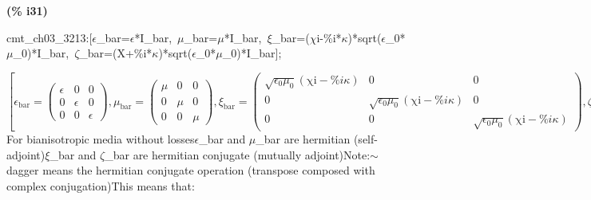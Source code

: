 \documentclass[fleqn]{article}
\begin{document}
\noindent
\begin{minipage}[t]{4.000000em}\color{red}\bfseries
(\% i31)	
\end{minipage}
\begin{minipage}[t]{\textwidth}\color{blue}
cmt\_ch03\_3213:[\ensuremath{\epsilon}\_bar=\ensuremath{\epsilon}*I\_bar,\ \ensuremath{\mu}\_bar=\ensuremath{\mu}*I\_bar,\ \ensuremath{\xi}\_bar=(\ensuremath{\chi}i-\%i*\ensuremath{\kappa})*sqrt(\ensuremath{\epsilon}\_0*\ensuremath{\mu}\_0)*I\_bar,\ \ensuremath{\zeta}\_bar=(X+\%i*\ensuremath{\kappa})*sqrt(\ensuremath{\epsilon}\_0*\ensuremath{\mu}\_0)*I\_bar];
\end{minipage}
\[\displaystyle \tag{cmt\_ ch03\_ 3213} 
\operatorname{[}{{\epsilon }_{\ensuremath{\mathrm{bar}}}}=\begin{pmatrix}\epsilon  & 0 & 0\\
0 & \epsilon  & 0\\
0 & 0 & \epsilon \end{pmatrix}\operatorname{,}{{\mu }_{\ensuremath{\mathrm{bar}}}}=\begin{pmatrix}\mu  & 0 & 0\\
0 & \mu  & 0\\
0 & 0 & \mu \end{pmatrix}\operatorname{,}{{\xi }_{\ensuremath{\mathrm{bar}}}}=\begin{pmatrix}\sqrt{{{\epsilon }_0} {{\mu }_0}} \left( \ensuremath{\mathrm{\chi i}}-\% i \kappa \right)  & 0 & 0\\
0 & \sqrt{{{\epsilon }_0} {{\mu }_0}} \left( \ensuremath{\mathrm{\chi i}}-\% i \kappa \right)  & 0\\
0 & 0 & \sqrt{{{\epsilon }_0} {{\mu }_0}} \left( \ensuremath{\mathrm{\chi i}}-\% i \kappa \right) \end{pmatrix}\operatorname{,}{{\zeta }_{\ensuremath{\mathrm{bar}}}}=\begin{pmatrix}\left( \% i \kappa +X\right)  \sqrt{{{\epsilon }_0} {{\mu }_0}} & 0 & 0\\
0 & \left( \% i \kappa +X\right)  \sqrt{{{\epsilon }_0} {{\mu }_0}} & 0\\
0 & 0 & \left( \% i \kappa +X\right)  \sqrt{{{\epsilon }_0} {{\mu }_0}}\end{pmatrix}\operatorname{]}\mbox{}
\]
For bianisotropic media without losses\ensuremath{\epsilon}\_bar and \ensuremath{\mu}\_bar are hermitian (self-adjoint)\ensuremath{\xi}\_bar and \ensuremath{\zeta}\_bar are hermitian conjugate (mutually adjoint)Note:\ensuremath{\sim }dagger means the hermitian conjugate operation (transpose composed with complex conjugation)This means that:
\end{document}
